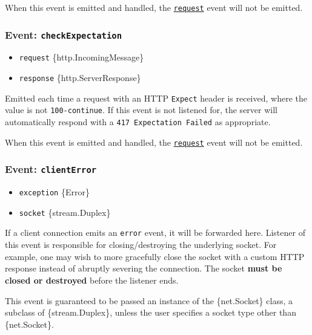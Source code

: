 When this event is emitted and handled, the
\hyperref[event-request]{\texttt{\textquotesingle{}request\textquotesingle{}}}
event will not be emitted.

\subsubsection{\texorpdfstring{Event:
\texttt{\textquotesingle{}checkExpectation\textquotesingle{}}}{Event: \textquotesingle checkExpectation\textquotesingle{}}}\label{event-checkexpectation}

\begin{itemize}
\tightlist
\item
  \texttt{request} \{http.IncomingMessage\}
\item
  \texttt{response} \{http.ServerResponse\}
\end{itemize}

Emitted each time a request with an HTTP \texttt{Expect} header is
received, where the value is not \texttt{100-continue}. If this event is
not listened for, the server will automatically respond with a
\texttt{417\ Expectation\ Failed} as appropriate.

When this event is emitted and handled, the
\hyperref[event-request]{\texttt{\textquotesingle{}request\textquotesingle{}}}
event will not be emitted.

\subsubsection{\texorpdfstring{Event:
\texttt{\textquotesingle{}clientError\textquotesingle{}}}{Event: \textquotesingle clientError\textquotesingle{}}}\label{event-clienterror}

\begin{itemize}
\tightlist
\item
  \texttt{exception} \{Error\}
\item
  \texttt{socket} \{stream.Duplex\}
\end{itemize}

If a client connection emits an
\texttt{\textquotesingle{}error\textquotesingle{}} event, it will be
forwarded here. Listener of this event is responsible for
closing/destroying the underlying socket. For example, one may wish to
more gracefully close the socket with a custom HTTP response instead of
abruptly severing the connection. The socket \textbf{must be closed or
destroyed} before the listener ends.

This event is guaranteed to be passed an instance of the \{net.Socket\}
class, a subclass of \{stream.Duplex\}, unless the user specifies a
socket type other than \{net.Socket\}.

